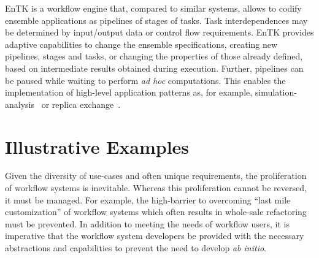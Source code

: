 \documentclass[preprint,12pt, a4paper]{elsarticle}
\begin{document}

EnTK is a workflow engine that, compared to similar systems, allows to codify
ensemble applications as pipelines of stages of tasks. Task interdependences
may be determined by input/output data or control flow requirements.
%
%
EnTK provides adaptive capabilities to change the ensemble specifications,
creating new pipelines, stages and tasks, or changing the properties of those
already defined, based on intermediate results obtained during execution.
Further, pipelines can be paused while waiting to perform \textit{ad hoc}
computations. This enables the implementation of high-level application
patterns as, for example,
simulation-analysis~\cite{balasubramanian2016extasy} or replica
exchange~\cite{treikalis2016repex}.






\section{Illustrative Examples}\label{sec:examples}

Given the diversity of use-cases and often unique requirements, the
proliferation of workflow systems is inevitable. Whereas this proliferation
cannot be reversed, it must be managed. For example, the high-barrier to
overcoming ``last mile customization'' of workflow systems which often
results in whole-sale refactoring must be prevented. In addition to meeting
the needs of workflow users, it is imperative that the workflow system
developers be provided with the necessary abstractions and capabilities to
prevent the need to develop \textit{ab initio}.
\end{document}
